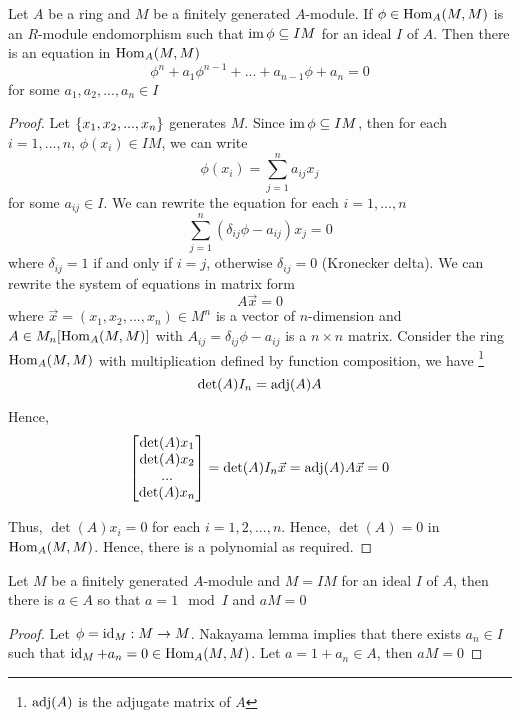 \begin{lemma}
	Let $A$ be a ring and $M$ be a finitely generated $A$-module. If $\phi \in \operatorname{Hom}_A(M, M)$ is an $R$-module endomorphism such that $\operatorname{im} \phi \subseteq IM$ for an ideal $I$ of $A$. Then there is an equation in $\operatorname{Hom}_A(M, M)$ 
	$$
		\phi^n + a_1 \phi^{n-1} + ... + a_{n-1} \phi + a_n = 0
	$$
	for some $a_1, a_2, ..., a_n \in I$
\end{lemma}
\begin{proof}
	Let $\{x_1, x_2, ..., x_n\}$ generates $M$. Since $\operatorname{im} \phi \subseteq IM$, then for each $i=1, ..., n$, $\phi(x_i) \in IM$, we can write
	$$
	\phi(x_i) = \sum_{j=1}^n a_{ij} x_j
	$$
	for some $a_{ij} \in I$. We can rewrite the equation for each $i=1, ..., n$
	$$
	\sum_{j=1}^n (\delta_{ij} \phi - a_{ij}) x_j = 0
	$$
	where $\delta_{ij} = 1$ if and only if $i = j$, otherwise $\delta_{ij} = 0$ (Kronecker delta). We can rewrite the system of equations in matrix form
	$$
	A \vec{x} = 0
	$$
	where $\vec{x} = (x_1, x_2, ..., x_n) \in M^n$ is a vector of $n$-dimension and $A \in M_n[\operatorname{Hom}_A(M, M)]$ with $A_{ij} = \delta_{ij} \phi - a_{ij}$ is a $n \times n$ matrix. Consider the ring $\operatorname{Hom}_A(M, M)$ with multiplication defined by function composition, we have \footnote{$\operatorname{adj}(A)$ is the adjugate matrix of $A$}
	$$
	\det(A) I_n = \operatorname{adj}(A) A
	$$
	
	Hence,
	$$
	\begin{bmatrix}
		\det(A) x_1 \\
		\det(A) x_2 \\
		... \\
		\det(A) x_n
	\end{bmatrix} = \det(A) I_n \vec{x} = \operatorname{adj}(A) A \vec{x} = 0
	$$
	
	Thus, $\det(A) x_i = 0$ for each $i= 1, 2,..., n$. Hence, $\det(A) = 0$ in $\operatorname{Hom}_A(M, M)$. Hence, there is a polynomial as required.
\end{proof}

\begin{corollary}
	Let $M$ be a finitely generated $A$-module and $M = IM$ for an ideal $I$ of $A$, then there is $a \in A$ so that $a = 1 \mod I$ and $aM = 0$
\end{corollary}

\begin{proof}
	Let $\phi = \operatorname{id}_{M}: M \to M$. Nakayama lemma implies that there exists $a_n \in I$ such that $\operatorname{id}_M + a_n = 0 \in \operatorname{Hom}_A(M, M)$. Let $a = 1 + a_n \in A$, then $aM = 0$
\end{proof}

